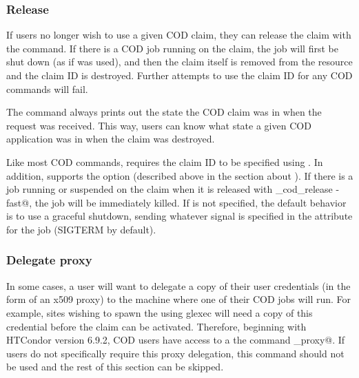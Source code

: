 \subsubsection{\label{sec:cod-claim-release}Release}

If users no longer wish to use a given COD claim,
they can release the claim with the  command.
If there is a COD job running on the claim,
the job will first be shut down (as if  was
used),
and then the claim itself is removed from the resource and the claim
ID is destroyed. 
Further attempts to use the claim ID for any COD commands will fail.

The  command always prints out the state the
COD claim was in when the request was received.
This way, users can know what state a given COD application was in
when the claim was destroyed.

Like most COD commands,  requires the claim ID to
be specified using .
In addition,  supports the  option
(described above in the section about ).
If there is a job running or suspended on the claim when it is
released with \verb@condor_cod_release -fast@, the job will be
immediately killed. 
If  is not specified, the default behavior is to use a
graceful shutdown, sending whatever signal is specified in the
 attribute for the job (SIGTERM by default).


\subsubsection{\label{sec:cod-claim-delegate}Delegate proxy}

In some cases, a user will want to delegate a copy of their user
credentials (in the form of an x509 proxy) to the machine where one of
their COD jobs will run.
For example, sites wishing to spawn the  using glexec
will need a copy of this credential before the claim can be activated.
Therefore, beginning with HTCondor version 6.9.2, COD users have access
to a the command \verb@delegate_proxy@.
If users do not specifically require this proxy delegation, this
command should not be used and the rest of this section can be skipped.

